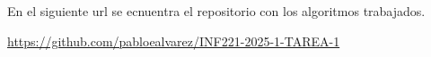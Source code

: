 En el siguiente url se ecnuentra el repositorio con los algoritmos trabajados.
\begin{mdframed}
    \begin{center}
        {\Large \url{https://github.com/pabloealvarez/INF221-2025-1-TAREA-1}}
    \end{center}
\end{mdframed}


